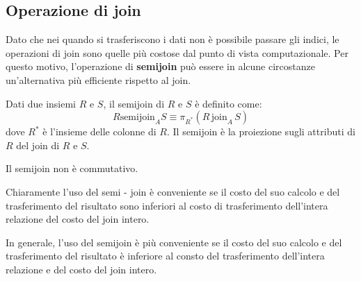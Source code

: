 \subsection{Operazione di join}
Dato che nei quando si trasferiscono i dati non è possibile passare gli indici,
le operazioni di join sono quelle più costose dal punto di vista computazionale.
Per questo motivo, l'operazione di \textbf{semijoin} può essere in alcune circostanze
un'alternativa più efficiente rispetto al join.
\begin{definizione}
      Dati due insiemi $R$ e $S$, il semijoin di $R$ e $S$ è definito come:
      \begin{equation*}
            R \text{semijoin}_A S \equiv \pi_{R^\ast}(R \, \text{join}_A \, S)
      \end{equation*}
      dove $R^\ast$ è l'insieme delle colonne di $R$. Il semijoin è la proiezione
      sugli attributi di $R$ del join di $R$ e $S$.
\end{definizione}
\begin{nota}
      Il semijoin non è commutativo.
\end{nota}
Chiaramente l'uso del semi - join è conveniente se il costo del suo calcolo e
del trasferimento del risultato sono inferiori al costo di trasferimento
dell'intera relazione del costo del join intero.

In generale, l'uso del semijoin è più conveniente se il costo del suo calcolo e
del trasferimento del risultato è inferiore al consto del trasferimento
dell'intera relazione e del costo del join intero.
